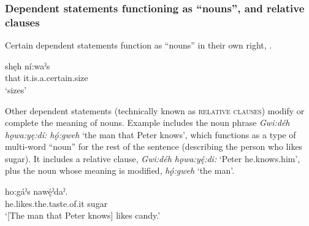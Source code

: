 \subsubsection{Dependent statements functioning as “nouns”, and relative clauses}
Certain dependent statements function as “nouns” in their own right, .

\ea\label{ex:nounclause}
\gll shęh ní:waˀs\\
that it.is.a.certain.size\\
\glt ‘sizes’

\z

Other dependent statements (technically known as \textsc{relative clauses}) modify or complete the meaning of nouns. Example  includes the noun phrase \textit{Gwi:déh hǫwa:yę:dí: hǫ́:gweh} ‘the man that Peter knows’, which functions as a type of multi-word “noun” for the rest of the sentence (describing the person who likes sugar). It includes a relative clause, \textit{Gwi:déh hǫwa:yę́:di:} ‘Peter he.knows.him’, plus the noun whose meaning is modified, \textit{hǫ́:gweh} ‘the man’.

\ea\label{ex:sentencetypeex6}
 ho:gáˀs  nawę́ˀdaˀ. \\
[Peter he.knows.him man] he.likes.the.taste.of.it sugar\\
\glt ‘[The man that Peter knows] likes candy.’
\z
